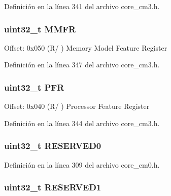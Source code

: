 Definición en la línea 341 del archivo core\+\_\+cm3.\+h.

\subsubsection[{\texorpdfstring{M\+M\+FR}{MMFR}}]{ uint32\+\_\+t M\+M\+FR}\hypertarget{struct_s_c_b___type_a037095d7dc8c30536cab793e28329c45}{}\label{struct_s_c_b___type_a037095d7dc8c30536cab793e28329c45}
Offset\+: 0x050 (R/ ) Memory Model Feature Register 

Definición en la línea 347 del archivo core\+\_\+cm3.\+h.

\subsubsection[{\texorpdfstring{P\+FR}{PFR}}]{ uint32\+\_\+t P\+FR}\hypertarget{struct_s_c_b___type_a0c3c74d90886d6f470882c63c0e60bfe}{}\label{struct_s_c_b___type_a0c3c74d90886d6f470882c63c0e60bfe}
Offset\+: 0x040 (R/ ) Processor Feature Register 

Definición en la línea 344 del archivo core\+\_\+cm3.\+h.

\subsubsection[{\texorpdfstring{R\+E\+S\+E\+R\+V\+E\+D0}{RESERVED0}}]{\setlength{\rightskip}{0pt plus 5cm}uint32\+\_\+t R\+E\+S\+E\+R\+V\+E\+D0}\hypertarget{struct_s_c_b___type_af86c61a5d38a4fc9cef942a12744486b}{}\label{struct_s_c_b___type_af86c61a5d38a4fc9cef942a12744486b}


Definición en la línea 309 del archivo core\+\_\+cm0.\+h.

\subsubsection[{\texorpdfstring{R\+E\+S\+E\+R\+V\+E\+D1}{RESERVED1}}]{\setlength{\rightskip}{0pt plus 5cm}uint32\+\_\+t R\+E\+S\+E\+R\+V\+E\+D1}\hypertarget{struct_s_c_b___type_ac4ac04e673b5b8320d53f7b0947db902}{}\label{struct_s_c_b___type_ac4ac04e673b5b8320d53f7b0947db902}


